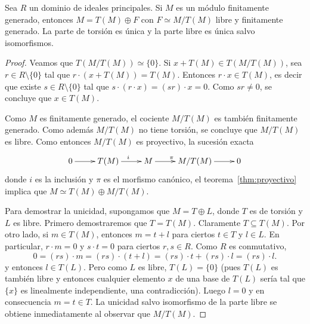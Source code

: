 \begin{theorem}
Sea $R$ un dominio de ideales principales. 
Si $M$ es un módulo finitamente generado, entonces $M=T(M)\oplus F$ con $F\simeq M/T(M)$ libre y finitamente generado. La
parte de torsión es única y la parte libre es única salvo isomorfismos.
\end{theorem}

\begin{proof}
	Veamos que $T(M/T(M))\simeq\{0\}$. Si $x+T(M)\in T(M/T(M))$, sea $r\in R\setminus\{0\}$ tal que
	$r\cdot (x+T(M))=T(M)$. Entonces $r\cdot x\in T(M)$, es decir que existe $s\in R\setminus\{0\}$ tal que $s\cdot (r\cdot x)=(sr)\cdot x=0$. 
	Como $sr\ne 0$, se concluye que $x\in T(M)$. 
	
	Como $M$ es finitamente generado, el cociente $M/T(M)$ es también finitamente generado. Como además $M/T(M)$ no tiene torsión, 
	se concluye que $M/T(M)$ es libre. 
	Como entonces $M/T(M)$ es proyectivo, la sucesión exacta 
	\[
	\xymatrix{
	 0\ar[r] 
	 & T(M)
	 \ar[r]^i
	 & M
	 \ar[r]^{\pi}
	 & M/T(M)
	 \ar[r]
	 & 0
	 }
	 \]
	 donde $i$ es la inclusión y $\pi$ es el morfismo canónico, 	el teorema~\ref{thm:proyectivo} 
	 implica que $M\simeq T(M)\oplus M/T(M)$. 	
	 
	 Para demostrar la unicidad, supongamos que $M=T\oplus L$, donde $T$ es de torsión y $L$ es libre. Primero
	 demostraremos que $T=T(M)$. Claramente 
	 $T\subseteq T(M)$. Por otro lado, si $m\in T(M)$, entonces $m=t+l$ para ciertos $t\in T$ y $l\in L$. En particular, 
	 $r\cdot m=0$ y $s\cdot t=0$ para ciertos $r,s\in R$. Como $R$ es conmutativo, 
	 \[
	 0=(rs)\cdot m=(rs)\cdot (t+l)=(rs)\cdot t+(rs)\cdot l=(rs)\cdot l.
	 \]
	 y entonces $l\in T(L)$. Pero 
	 como $L$ es libre, $T(L)=\{0\}$ (pues $T(L)$ es también libre y entonces cualquier elemento $x$  
	 de una base de $T(L)$ sería tal que $\{x\}$ es linealmente independiente, una contradicción). Luego 
	 $l=0$ y en consecuencia $m=t\in T$. La unicidad salvo isomorfismo de la parte libre
	 se obtiene inmediatamente al observar que $M/T(M)$. 
\end{proof}



